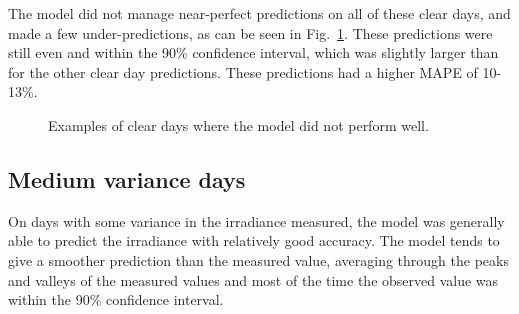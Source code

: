 The model did not manage near-perfect predictions on all of these clear days, and made a few under-predictions, as can be seen in Fig.~\ref{fig:full_low_worst}.
These predictions were still even and within the 90\% confidence interval, which was slightly larger than for the other clear day predictions. These predictions had a higher MAPE of 10-13\%.
\begin{figure}[ht!]
    \centering
    \qquad
    \qquad
    \caption{Examples of clear days where the model did not perform well.
    \label{fig:full_low_worst}}
\end{figure}


\subsection{Medium variance days}
On days with some variance in the irradiance measured, the model was generally able to predict the irradiance with relatively good accuracy.
The model tends to give a smoother prediction than the measured value, averaging through the peaks and valleys of the measured values and most of the time the observed value was within the 90\% confidence interval. 

